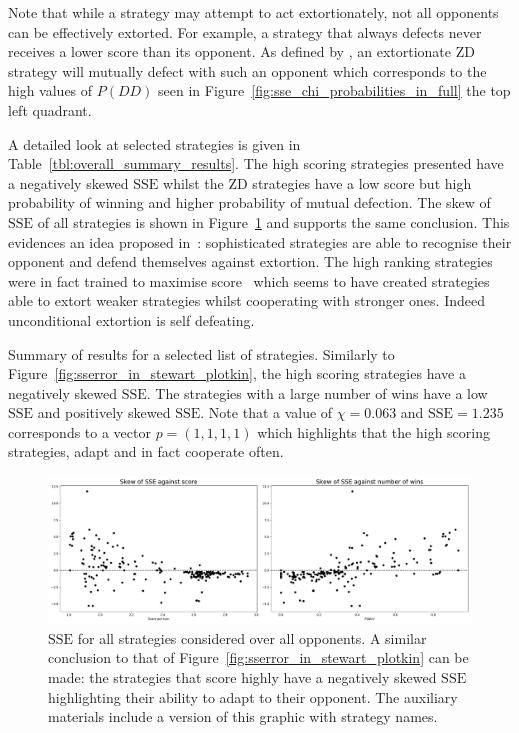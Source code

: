 \documentclass[a4paper]{article}
\newcommand{\SSe}{\text{SSE}}
\begin{document}
Note that while a strategy may attempt to act extortionately, not all opponents
can be effectively extorted. For example, a strategy that always defects never
receives a lower score than its opponent. As defined by \cite{Press2012}, an
extortionate ZD strategy will mutually defect with such an opponent which
corresponds to the high values of \(P(DD)\) seen in
Figure~\ref{fig:sse_chi_probabilities_in_full} the top left quadrant.

A detailed look at selected strategies is given in
Table~\ref{tbl:overall_summary_results}. The high scoring strategies presented
have a negatively skewed \(\SSe\) whilst the ZD strategies have a low score but
high probability of winning and higher probability of mutual defection.
The skew of \(\SSe\) of all strategies is shown in
Figure~\ref{fig:sserror_in_std} and supports the
same conclusion. This evidences an idea proposed
in~\cite{adami2013evolutionary}: sophisticated strategies are able to recognise
their opponent and defend themselves against extortion.  The high ranking
strategies were in fact trained to maximise score~\cite{Harper2017} which seems
to have created strategies able to extort weaker strategies whilst cooperating
with stronger ones. Indeed unconditional extortion is self defeating.

\begin{table}[!hbtp]
    \begin{center}
    \small
    
    \end{center}
    \caption{Summary of results for a selected list of strategies. Similarly to
        Figure~\ref{fig:sserror_in_stewart_plotkin}, the high scoring strategies
        have a negatively skewed \(\SSe\). The strategies with a
        large number of wins have a low \(\SSe\) and positively skewed
        \(\SSe\). Note that a value of \(\chi=0.063\) and \(\SSe=1.235\)
        corresponds to a vector \(p=(1,1,1,1)\) which highlights that the high
        scoring strategies, adapt and in fact cooperate often.}
    \label{tbl:overall_summary_results}
\end{table}

\begin{figure}[!htbp]
    \centering
    \includegraphics[width=\textwidth]{./assets/img/sserror_in_std/main.pdf}
    \caption{\(\SSe\) for all strategies considered over all opponents.
        A similar conclusion to that of
        Figure~\ref{fig:sserror_in_stewart_plotkin} can be made: the strategies
        that score highly have a negatively skewed \(\SSe\) highlighting their
        ability to adapt to their opponent. The auxiliary materials include a
        version of this graphic with strategy names.}
        \label{fig:sserror_in_std}
\end{figure}
\end{document}
